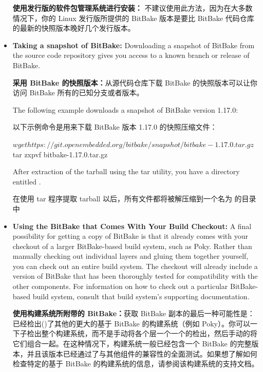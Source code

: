\begin{itemize}
\medskip
\textbf{使用发行版的软件包管理系统进行安装：} 不建议使用此方法，因为在大多数情况下，你的 Linux 发行版所提供的 BitBake 版本是要比 BitBake 代码仓库的最新的快照版本晚好几个发行版本。

\medskip
\item \textbf{Taking a snapshot of BitBake:} Downloading a snapshot of BitBake from the source code repository gives you access to a known branch or release of BitBake.

\medskip
\textbf{采用 BitBake 的快照版本：}从源代码仓库下载 BitBake 的快照版本可以让你访问 BitBake 所有的已知分支或者版本。


\medskip
The following example downloads a snapshot of BitBake version 1.17.0:

\medskip
以下示例命令是用来下载 BitBake 版本 1.17.0 的快照压缩文件：

\medskip
\begin{pyglist}
$ wget https://git.openembedded.org/bitbake/snapshot/bitbake-1.17.0.tar.gz
$ tar zxpvf bitbake-1.17.0.tar.gz
\end{pyglist}

\medskip
After extraction of the tarball using the tar utility, you have a directory entitled .

\medskip
在使用 tar 程序提取 tarball 以后，所有文件都将被解压缩到一个名为  的目录中

\item \textbf{Using the BitBake that Comes With Your Build Checkout:} A final possibility for getting a copy of BitBake is that it already comes with your checkout of a larger BitBake-based build system, such as Poky. Rather than manually checking out individual layers and gluing them together yourself, you can check out an entire build system. The checkout will already include a version of BitBake that has been thoroughly tested for compatibility with the other components. For information on how to check out a particular BitBake-based build system, consult that build system's supporting documentation.

\medskip
\textbf{使用构建系统所附带的 BitBake：}获取 BitBake 副本的最后一种可能性是： 已经检出()了其他的更大的基于 BitBake 的构建系统（例如 Poky）。你可以一下子检出整个构建系统，而不是手动将各个层一个一个的检出，然后手动的将它们组合一起。在这种情况下，构建系统一般已经包含一个 BitBake 的完整版本，并且该版本已经通过了与其他组件的兼容性的全面测试。如果想了解如何检查特定的基于 BitBake 的构建系统的信息，请参阅该构建系统的支持文档。
\end{itemize}

